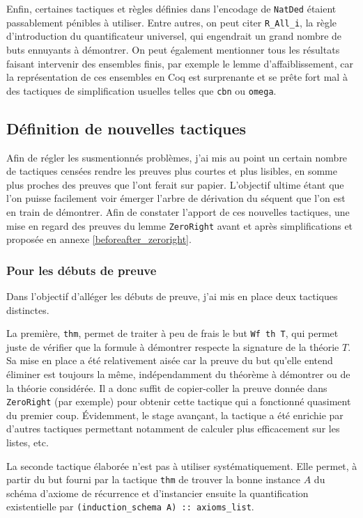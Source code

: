 \documentclass[a4paper]{article}
\theoremstyle{remark}
\theoremstyle{remark}
\theoremstyle{remark}
\theoremstyle{definition}
\theoremstyle{definition}
\theoremstyle{definition}
\begin{document}
Enfin, certaines tactiques et règles définies dans l'encodage de \verb+NatDed+ étaient passablement pénibles à utiliser. Entre autres, on peut citer \verb+R_All_i+, la règle d'introduction du quantificateur universel, qui engendrait un grand nombre de buts ennuyants à démontrer. On peut également mentionner tous les résultats faisant intervenir des ensembles finis, par exemple le lemme d'affaiblissement, car la représentation de ces ensembles en Coq est surprenante et se prête fort mal à des tactiques de simplification usuelles telles que \verb+cbn+ ou \verb+omega+.

\subsection{Définition de nouvelles tactiques}

Afin de régler les susmentionnés problèmes, j'ai mis au point un certain nombre de tactiques censées rendre les preuves plus courtes et plus lisibles, en somme plus proches des preuves que l'ont ferait sur papier. L'objectif ultime étant que l'on puisse facilement voir émerger l'arbre de dérivation du séquent que l'on est en train de démontrer. Afin de constater l'apport de ces nouvelles tactiques, une mise en regard des preuves du lemme \verb+ZeroRight+ avant et après simplifications et proposée en annexe \ref{beforeafter_zeroright}.

\subsubsection{Pour les débuts de preuve}

Dans l'objectif d'alléger les débuts de preuve, j'ai mis en place deux tactiques distinctes.
\smallskip

La première, \verb+thm+, permet de traiter à peu de frais le but \verb+Wf th T+, qui permet juste de vérifier que la formule à démontrer respecte la signature de la théorie $T$. Sa mise en place a été relativement aisée car la preuve du but qu'elle entend éliminer est toujours la même, indépendamment du théorème à démontrer ou de la théorie considérée. Il a donc suffit de copier-coller la preuve donnée dans \verb+ZeroRight+ (par exemple) pour obtenir cette tactique qui a fonctionné quasiment du premier coup. \'Evidemment, le stage avançant, la tactique a été enrichie par d'autres tactiques permettant notamment de calculer plus efficacement sur les listes, etc.
\smallskip

La seconde tactique élaborée n'est pas à utiliser systématiquement. Elle permet, à partir du but fourni par la tactique \verb+thm+ de trouver la bonne instance $A$ du schéma d'axiome de récurrence et d'instancier ensuite la quantification existentielle par \verb$(induction_schema A) :: axioms_list$.
\end{document}
